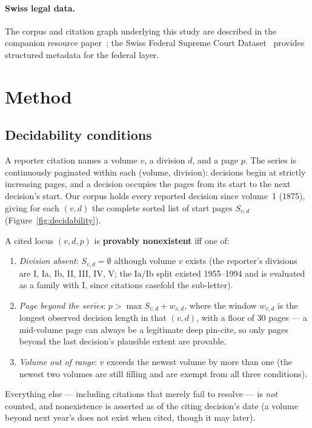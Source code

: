 \documentclass[11pt,a4paper]{article}
\begin{document}
\paragraph{Swiss legal data.} The corpus and citation graph underlying
this study are described in the companion resource
paper~\citep{hertner2026opencaselaw}; the Swiss Federal Supreme Court
Dataset~\citep{geering2024scd} provides structured metadata for the
federal layer.

\section{Method}\label{sec:method}

\subsection{Decidability conditions}\label{sec:decidable}

A reporter citation names a volume $v$, a division $d$, and a page $p$.
The series is continuously paginated within each (volume, division):
decisions begin at strictly increasing pages, and a decision occupies
the pages from its start to the next decision's start. Our corpus holds
every reported decision since volume~1 (1875), giving for each $(v,d)$
the complete sorted list of start pages $S_{v,d}$
(Figure~\ref{fig:decidability}).

A cited locus $(v,d,p)$ is \textbf{provably nonexistent} iff one of:
\begin{enumerate}
\item \emph{Division absent}: $S_{v,d} = \emptyset$ although volume $v$
      exists (the reporter's divisions are I, Ia, Ib, II, III, IV, V;
      the Ia/Ib split existed 1955--1994 and is evaluated as a family
      with I, since citations casefold the sub-letter).
\item \emph{Page beyond the series}: $p > \max S_{v,d} + w_{v,d}$, where
      the window $w_{v,d}$ is the longest observed decision length in
      that $(v,d)$, with a floor of 30 pages --- a mid-volume page can
      always be a legitimate deep pin-cite, so only pages beyond the
      last decision's plausible extent are provable.
\item \emph{Volume out of range}: $v$ exceeds the newest volume by more
      than one (the newest two volumes are still filling and are exempt
      from all three conditions).
\end{enumerate}
Everything else --- including citations that merely fail to resolve ---
is \emph{not} counted, and nonexistence is asserted as of the citing
decision's date (a volume beyond next year's does not exist when cited,
though it may later).
\end{document}
